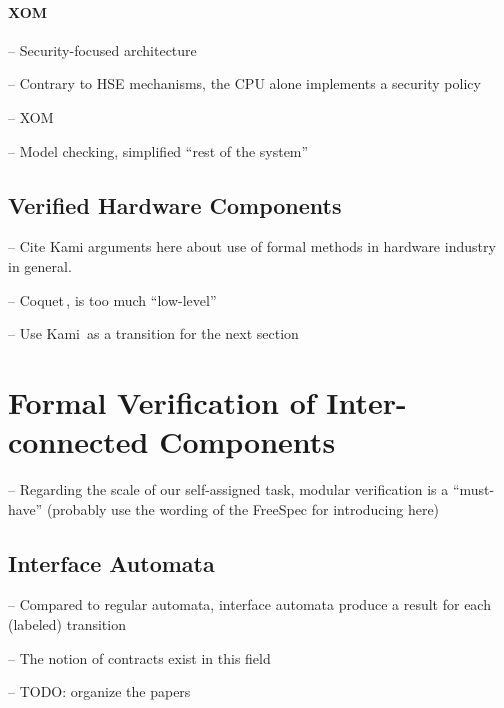 \paragraph{XOM}
%
\begin{compactitem}
\item[--] Security-focused architecture
\item[--] Contrary to HSE mechanisms, the CPU alone implements a security policy
\item[--] XOM\,\cite{lie2003xom}
\item[--] Model checking, simplified ``rest of the system''
\end{compactitem}

\subsection{Verified Hardware Components}

\begin{compactitem}
\item[--] Cite Kami arguments here about use of formal methods in hardware
  industry in general.
\end{compactitem}

\begin{compactitem}
\item[--] Coquet\,\cite{braibant2011coquet}, is too much ``low-level''
\item[--] Use Kami\,\cite{choi2017kami} as a transition for the next section
\end{compactitem}

\section{Formal Verification of Inter-connected Components} %
\label{sec:relatedwork:modular}

\begin{compactitem}
\item[--] Regarding the scale of our self-assigned task, modular verification is
  a ``must-have'' (probably use the wording of the FreeSpec for introducing
  here)
\end{compactitem}

\subsection{Interface Automata}

\begin{compactitem}
\item[--] Compared to regular automata, interface automata produce a result for
  each (labeled) transition
\item[--] The notion of contracts exist in this field
\item[--] TODO: organize the papers
\end{compactitem}

